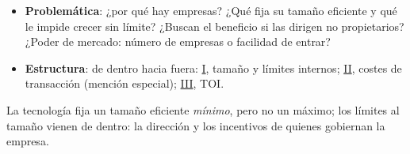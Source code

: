 \documentclass{article}
\begin{document}
\begin{columnas}
\begin{itemize}
\item \textbf{Problemática}: ¿por qué hay empresas? ¿Qué fija su tamaño eficiente y qué le impide crecer sin límite? ¿Buscan el beneficio si las dirigen no propietarios? ¿Poder de mercado: número de empresas o facilidad de entrar?
\item \textbf{Estructura}: de dentro hacia fuera: \hyperref[rep:I]{I}, tamaño y límites internos; \hyperref[rep:II]{II}, costes de transacción (mención especial); \hyperref[rep:III]{III}, TOI.
\end{itemize}

\begin{ideaclave}
La tecnología fija un tamaño eficiente \emph{mínimo}, pero no un máximo; los límites al tamaño vienen de dentro: la dirección y los incentivos de quienes gobiernan la empresa.
\end{ideaclave}


\end{columnas}
\end{document}
